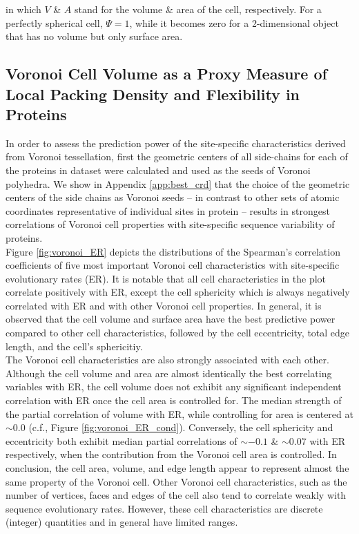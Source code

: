 \documentclass[11pt]{article}
\begin{document}
    \noindent in which $V$ \& $A$ stand for the volume \& area of the cell, respectively. For a perfectly spherical cell, $\Psi=1$, while it becomes zero for a 2-dimensional object that has no volume but only surface area.

    \subsection*{Voronoi Cell Volume as a Proxy Measure of Local Packing Density and Flexibility in Proteins}



    In order to assess the prediction power of the site-specific characteristics derived from Voronoi tessellation, first the geometric centers of all side-chains for each of the proteins in dataset were calculated and used as the seeds of Voronoi polyhedra. We show in Appendix \ref{app:best_crd} that the choice of the geometric centers of the side chains as Voronoi seeds -- in contrast to other sets of atomic coordinates representative of individual sites in protein -- results in strongest correlations of Voronoi cell properties with site-specific sequence variability of proteins.  \\

    Figure \ref{fig:voronoi_ER} depicts the distributions of the Spearman's correlation coefficients of five most important Voronoi cell characteristics with site-specific evolutionary rates (ER). It is notable that all cell characteristics in the plot correlate positively with ER, except the cell sphericity which is always negatively correlated with ER and with other Voronoi cell properties. In general, it is observed that the cell volume and surface area have the best predictive power compared to other cell characteristics, followed by the cell eccentricity, total edge length, and the cell's sphericitiy. \\

    The Voronoi cell characteristics are also strongly associated with each other. Although the cell volume and area are almost identically the best correlating variables with ER, the cell volume does not exhibit any significant independent correlation with ER once the cell area is controlled for. The median strength of the partial correlation of volume with ER, while controlling for area is centered at $\sim0.0$ (c.f., Figure \ref{fig:voronoi_ER_cond}). Conversely, the cell sphericity and eccentricity both exhibit median partial correlations of $\sim-0.1$ \& $\sim0.07$ with ER respectively, when the contribution from the Voronoi cell area is controlled. In conclusion, the cell area, volume, and edge length appear to represent almost the same property of the Voronoi cell. Other Voronoi cell characteristics, such as the number of vertices, faces and edges of the cell also tend to correlate weakly with sequence evolutionary rates. However, these cell characteristics are discrete (integer) quantities and in general have limited ranges. \\
\end{document}
